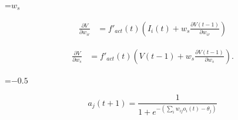 {\newpage
\clearpage
\samepage \setbox\sizebox=\hbox{$w_{s}$}\box\sizebox
}

{\newpage
\clearpage
\samepage \begin{eqnarray*}\frac{\partial V}{\partial w_{ir}} & = 
   f'_{act}(t) (I_{i}(t)+w_{s} \frac{\partial V(t-1)}{\partial w_{ir}}) 
\end{eqnarray*}
}

{\newpage
\clearpage
\samepage \begin{eqnarray*}\frac{\partial V}{\partial w_{s}} & = 
   f'_{act}(t) (V(t-1)+w_{s} \frac{\partial V(t-1)}{\partial w_{s}}).
\end{eqnarray*}
}

{\newpage
\clearpage
\samepage {}
}

{\newpage
\clearpage
\samepage \begin{figure}[htbp]
\begin{center}
  \begin{minipage}{\textwidth}
  \end{minipage}

\label{cascade window}
\end{center}
\end{figure}
}

{\newpage
\clearpage
\samepage \setbox\sizebox=\hbox{$-0.5$}\box\sizebox
}

{\newpage
\clearpage
\samepage {}
}

{\newpage
\clearpage
\samepage \begin{figure}[htbp]
\begin{center}
  \begin{minipage}{\textwidth}
  \end{minipage}

\label{TD_naming.ps}
\end{center}
\end{figure}
}

{\newpage
\clearpage
\samepage \begin{displaymath}%
a_{j}(t+1) = \frac{1}{{1 + e^{- \left( \sum_{i} w_{ij} o_{i}(t) 
                                        - \theta_{j} \right) }}}
\end{displaymath}
}

